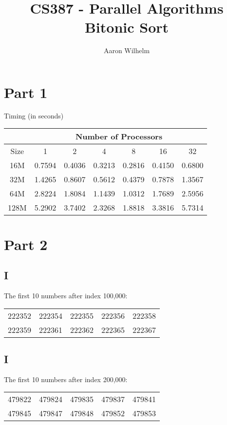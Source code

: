 \documentclass[a4paper,12pt]{article}
\begin{document}
\lstset{basicstyle=1,xleftmargin=-1in}

\title{CS387 - Parallel Algorithms\\Bitonic Sort}
\author{Aaron Wilhelm}
\maketitle
\newpage
\section*{Part 1}
    \begin{center}
        Timing (in seconds)

        \begin{tabular}{| c | c | c | c | c | c | c |}
            \hline
            ~ & \multicolumn{6}{c|}{Number of Processors}\\
            \hline
            Size & 1 & 2 & 4 & 8 & 16 & 32\\
            \hline
            16M  & 0.7594 & 0.4036 & 0.3213 & 0.2816 & 0.4150 & 0.6800 \\
            32M  & 1.4265 & 0.8607 & 0.5612 & 0.4379 & 0.7878 & 1.3567 \\
            64M  & 2.8224 & 1.8084 & 1.1439 & 1.0312 & 1.7689 & 2.5956 \\
            128M & 5.2902 & 3.7402 & 2.3268 & 1.8818 & 3.3816 & 5.7314 \\
            \hline
        \end{tabular}
    \end{center}

\section*{Part 2}
    \subsection*{I}
     The first 10 numbers after index 100,000:
      \begin{center}
        \begin{tabular}{ c  c  c  c  c }
            222352 & 222354 & 222355 & 222356 & 222358 \\ 
            222359 & 222361 & 222362 & 222365 & 222367
        \end{tabular}
      \end{center}

    \subsection*{I}
     The first 10 numbers after index 200,000:
      \begin{center}
        \begin{tabular}{ c  c  c  c  c }
            479822 &  479824 &  479835 &  479837 &  479841\\
            479845 &  479847 &  479848  & 479852 &  479853
        \end{tabular}
      \end{center}
\end{document}

